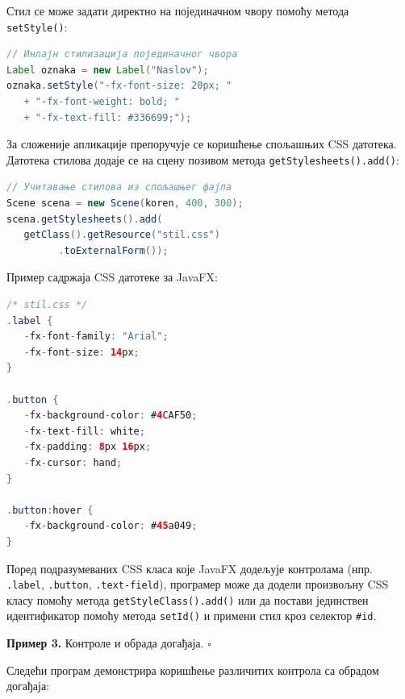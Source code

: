Стил се може задати директно на појединачном чвору помоћу метода \texttt{setStyle()}:


\begin{lstlisting}[language=Java]
// Инлајн стилизација појединачног чвора
Label oznaka = new Label("Naslov");
oznaka.setStyle("-fx-font-size: 20px; "
   + "-fx-font-weight: bold; "
   + "-fx-text-fill: #336699;");
\end{lstlisting}


За сложеније апликације препоручује се коришћење спољашњих CSS датотека. Датотека стилова додаје се на сцену позивом метода \texttt{getStylesheets().add()}:


\begin{lstlisting}[language=Java]
// Учитавање стилова из спољашњег фајла
Scene scena = new Scene(koren, 400, 300);
scena.getStylesheets().add(
   getClass().getResource("stil.css")
         .toExternalForm());
\end{lstlisting}


Пример садржаја CSS датотеке за JavaFX:


\begin{lstlisting}[language=Java]
/* stil.css */
.label {
   -fx-font-family: "Arial";
   -fx-font-size: 14px;
}
 
.button {
   -fx-background-color: #4CAF50;
   -fx-text-fill: white;
   -fx-padding: 8px 16px;
   -fx-cursor: hand;
}
 
.button:hover {
   -fx-background-color: #45a049;
}
\end{lstlisting}


Поред подразумеваних CSS класа које JavaFX додељује контролама (нпр. \texttt{.label}, \texttt{.button}, \texttt{.text-field}), програмер може да додели произвољну CSS класу помоћу метода \texttt{getStyleClass().add()} или да постави јединствен идентификатор помоћу метода \texttt{setId()} и примени стил кроз селектор \texttt{\#id}.


\bigskip

\noindent \textbf{Пример 3.} Контроле и обрада догађаја. $\square$

\medskip

Следећи програм демонстрира коришћење различитих контрола са обрадом догађаја:


